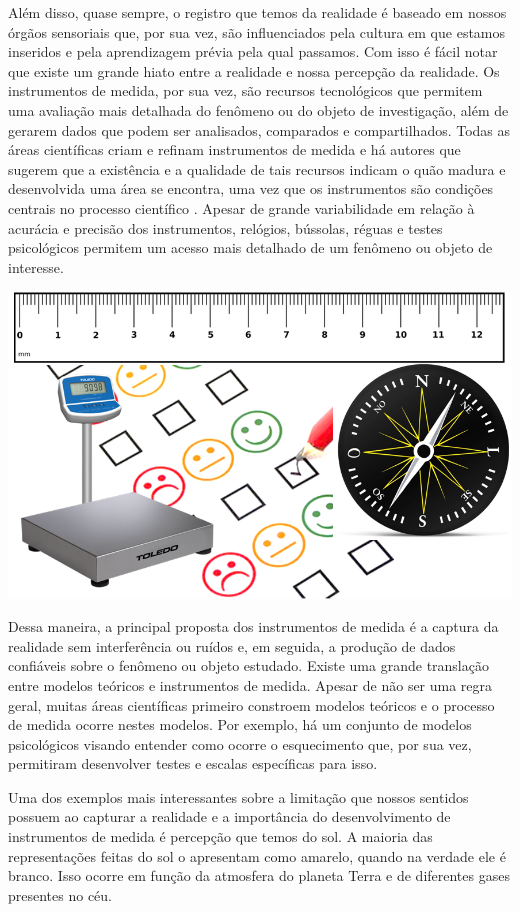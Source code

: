 \documentclass[
]{book}
\begin{document}
Além disso, quase sempre, o registro que temos da realidade é baseado em nossos órgãos sensoriais que, por sua vez, são influenciados pela cultura em que estamos inseridos e pela aprendizagem prévia pela qual passamos. Com isso é fácil notar que existe um grande hiato entre a realidade e nossa percepção da realidade. Os instrumentos de medida, por sua vez, são recursos tecnológicos que permitem uma avaliação mais detalhada do fenômeno ou do objeto de investigação, além de gerarem dados que podem ser analisados, comparados e compartilhados. Todas as áreas científicas criam e refinam instrumentos de medida e há autores que sugerem que a existência e a qualidade de tais recursos indicam o quão madura e desenvolvida uma área se encontra, uma vez que os instrumentos são condições centrais no processo científico \citep{Bergenholtz2018}. Apesar de grande variabilidade em relação à acurácia e precisão dos instrumentos, relógios, bússolas, réguas e testes psicológicos permitem um acesso mais detalhado de um fenômeno ou objeto de interesse.

\includegraphics{./img/cap_instrumentos.png}

Dessa maneira, a principal proposta dos instrumentos de medida é a captura da realidade sem interferência ou ruídos e, em seguida, a produção de dados confiáveis sobre o fenômeno ou objeto estudado. Existe uma grande translação entre modelos teóricos e instrumentos de medida. Apesar de não ser uma regra geral, muitas áreas científicas primeiro constroem modelos teóricos e o processo de medida ocorre nestes modelos. Por exemplo, há um conjunto de modelos psicológicos visando entender como ocorre o esquecimento que, por sua vez, permitiram desenvolver testes e escalas específicas para isso.

Uma dos exemplos mais interessantes sobre a limitação que nossos sentidos possuem ao capturar a realidade e a importância do desenvolvimento de instrumentos de medida é percepção que temos do sol. A maioria das representações feitas do sol o apresentam como amarelo, quando na verdade ele é branco. Isso ocorre em função da atmosfera do planeta Terra e de diferentes gases presentes no céu.
\end{document}
